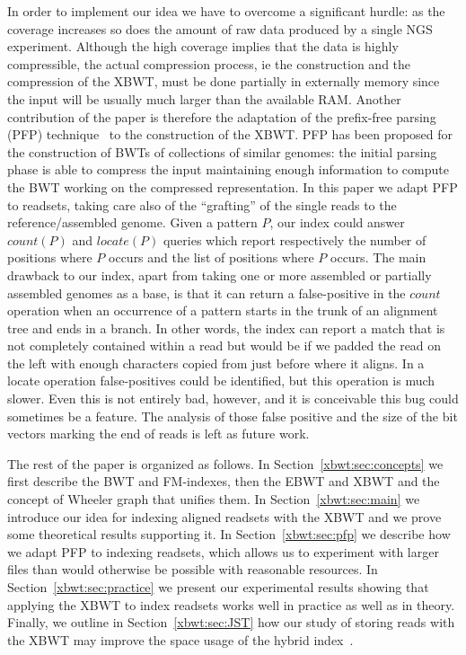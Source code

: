 In order to implement our idea we have to overcome a significant hurdle: as the coverage increases so does the amount of raw data produced by a single NGS experiment. Although the high coverage implies that the data is highly compressible, the actual compression process, ie the construction and the compression of the XBWT, must be done partially in externally memory since the input will be usually much larger than the available RAM. Another contribution of the paper is therefore the adaptation of the prefix-free parsing (PFP) technique~\cite{boucher2019prefix} to the construction of the XBWT. PFP has been proposed for the construction of BWTs of collections of similar genomes: the initial parsing phase is able to compress the input maintaining enough information to compute the BWT working on the compressed representation. In this paper we adapt PFP to readsets, taking care also of the ``grafting'' of the single reads to the reference/assembled genome.
Given a pattern $P$, our index could answer $count(P)$ and $locate(P)$ queries which report respectively the number of positions where $P$ occurs and the list of positions where $P$ occurs. The main drawback to our index, apart from taking one or more assembled or partially assembled genomes as a base, is that it can return a false-positive in the $count$ operation when an occurrence of a pattern starts in the trunk of an alignment tree and ends in a branch.  In other words, the index can report a match that is not completely contained within a read but would be if we padded the read on the left with enough characters copied from just before where it aligns. In a locate operation false-positives could be identified, but this operation is much slower. Even this is not entirely bad, however, and it is conceivable this bug could sometimes be a feature.
The analysis of those false positive and the size of the bit vectors marking the end of reads is left as future work.

The rest of the paper is organized as follows. In Section~\ref{xbwt:sec:concepts} we first describe the BWT and FM-indexes, then the EBWT and XBWT and the concept of Wheeler graph that unifies them. 
In Section~\ref{xbwt:sec:main} we introduce our idea for indexing aligned readsets with the XBWT {and we prove some theoretical results supporting it}.  In Section~\ref{xbwt:sec:pfp} we describe how we adapt PFP to indexing readsets, which allows us to experiment with larger files than would otherwise be possible with reasonable resources. In Section~\ref{xbwt:sec:practice} we present our experimental results showing that applying the XBWT to index readsets works well in practice as well as in theory. Finally, we outline in Section~\ref{xbwt:sec:JST} how our study of storing reads with the XBWT may improve the space usage of the hybrid index~\cite{ferrada2014hybrid,ferrada2018hybrid,gagie2015searching}.